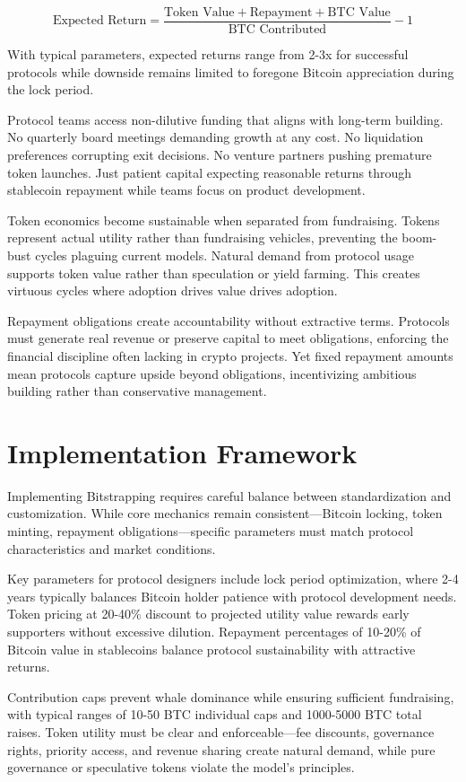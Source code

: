 \[
\text{Expected Return} = \frac{\text{Token Value} + \text{Repayment} + \text{BTC Value}}{\text{BTC Contributed}} - 1
\]

With typical parameters, expected returns range from 2-3x for successful protocols while downside remains limited to foregone Bitcoin appreciation during the lock period.

Protocol teams access non-dilutive funding that aligns with long-term building. No quarterly board meetings demanding growth at any cost. No liquidation preferences corrupting exit decisions. No venture partners pushing premature token launches. Just patient capital expecting reasonable returns through stablecoin repayment while teams focus on product development.

Token economics become sustainable when separated from fundraising. Tokens represent actual utility rather than fundraising vehicles, preventing the boom-bust cycles plaguing current models. Natural demand from protocol usage supports token value rather than speculation or yield farming. This creates virtuous cycles where adoption drives value drives adoption.

Repayment obligations create accountability without extractive terms. Protocols must generate real revenue or preserve capital to meet obligations, enforcing the financial discipline often lacking in crypto projects. Yet fixed repayment amounts mean protocols capture upside beyond obligations, incentivizing ambitious building rather than conservative management.

\section{Implementation Framework}

Implementing Bitstrapping requires careful balance between standardization and customization. While core mechanics remain consistent—Bitcoin locking, token minting, repayment obligations—specific parameters must match protocol characteristics and market conditions.

Key parameters for protocol designers include lock period optimization, where 2-4 years typically balances Bitcoin holder patience with protocol development needs. Token pricing at 20-40\% discount to projected utility value rewards early supporters without excessive dilution. Repayment percentages of 10-20\% of Bitcoin value in stablecoins balance protocol sustainability with attractive returns.

Contribution caps prevent whale dominance while ensuring sufficient fundraising, with typical ranges of 10-50 BTC individual caps and 1000-5000 BTC total raises. Token utility must be clear and enforceable—fee discounts, governance rights, priority access, and revenue sharing create natural demand, while pure governance or speculative tokens violate the model's principles.

